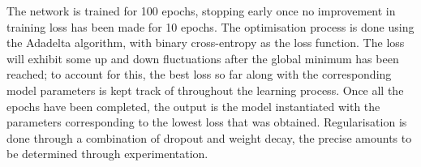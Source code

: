 The network is trained for 100 epochs, stopping early once no improvement in
training loss has been made for 10 epochs. The optimisation process is done
using the Adadelta\citep{adadelta} algorithm, with binary cross-entropy as the loss
function.  The loss will exhibit some up and down fluctuations after the global
minimum has been reached; to account for this, the best loss so far along with
the corresponding model parameters is kept track of throughout the learning
process. Once all the epochs have been completed, the output is the model
instantiated with the parameters corresponding to the lowest loss that was
obtained. Regularisation is done through a combination of dropout and weight
decay, the precise amounts to be determined through experimentation.

\begin{figure}[htbp]
  \centering
  \begin{subfigure}[b]{0.45\textwidth}

\end{subfigure}
\end{figure}
